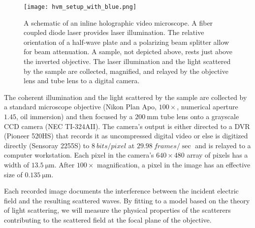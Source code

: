 \begin{figure}
  \centering
  \texttt{[image: hvm\_setup\_with\_blue.png]}
  \caption{A schematic of an inline holographic video microscope. A fiber
    coupled diode laser provides laser illumination. The relative orientation
    of a half-wave plate and a polarizing beam splitter allow for beam attenuation.
    A sample, not depicted above, rests just above the inverted objective.
    The laser illumination and the light scattered by the sample
    are collected, magnified, and relayed by the objective lens
    and tube lens to a digital camera.}
  \label{fig:hvm_setup}
\end{figure}


The coherent illumination and the light scattered by the sample are collected by a
standard microscope objective (Nikon Plan Apo, $\num{100}\times$,
numerical aperture $\num{1.45}$, oil immersion) and then focused
by a $\SI{200}{\mm}$ tube lens onto a grayscale CCD camera
(NEC TI-324AII).
The camera's output is either directed to a DVR (Pioneer 520HS) that records
it as uncompressed digital video or else is digitized directly (Sensoray 2255S)
to $\SI{8}{bits\per pixel}$ at $\SI{29.98}{frames\per\sec}$ and is relayed
to a computer workstation.
Each pixel in the camera's $\si{640\times 480}$ array of pixels has a width of
$\SI{13.5}{\um}$. After $100\times$ magnification, a pixel in the
image has an effective size of $\SI{0.135}{\um}$.

Each recorded image documents the interference between the incident
electric field and the resulting scattered waves. By fitting
to a model based on the theory of light scattering, we will measure the physical
properties of the scatterers contributing to the scattered field
at the focal plane of the objective.





